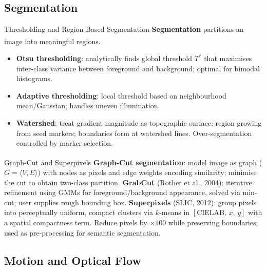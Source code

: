 \subsection{Segmentation}

\begin{v3topic}{Thresholding and Region-Based Segmentation}
    \textbf{Segmentation} partitions an image into meaningful regions\textsuperscript{\cite[][pp.~741--804]{gonzalezWoods2018}}.
    \begin{itemize}
        \item \textbf{Otsu thresholding}: analytically finds global threshold $T^*$ that maximises inter-class variance between foreground and background; optimal for bimodal histograms.
        \item \textbf{Adaptive thresholding}: local threshold based on neighbourhood mean/Gaussian; handles uneven illumination.
        \item \textbf{Watershed}: treat gradient magnitude as topographic surface; region growing from seed markers; boundaries form at watershed lines. Over-segmentation controlled by marker selection.
    \end{itemize}

\end{v3topic}
\begin{v3topic}{Graph-Cut and Superpixels}
    \textbf{Graph-Cut segmentation}\textsuperscript{\cite[][pp.~302--306]{szeliski2022}}: model image as graph ($G = \langle V, E \rangle$) with nodes as pixels and edge weights encoding similarity; minimise the cut to obtain two-class partition.
    \textbf{GrabCut} (Rother et al., 2004): iterative refinement using GMMs for foreground/background appearance, solved via min-cut; user supplies rough bounding box.
\visualseparator
    \textbf{Superpixels} (SLIC, 2012): group pixels into perceptually uniform, compact clusters via $k$-means in $[\mathrm{CIELAB},\,x,\,y]$ with a spatial compactness term.
    Reduce pixels by ${\times}100$ while preserving boundaries; used as pre-processing for semantic segmentation.
\end{v3topic}

\subsection{Motion and Optical Flow}

